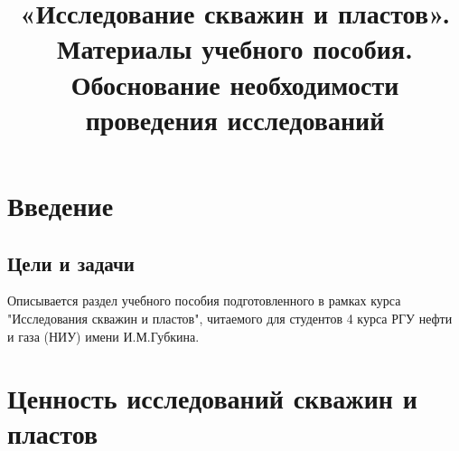 \documentclass[oneside, openany]{memoir}
\begin{document}
\title{«Исследование скважин и пластов». Материалы учебного пособия. Обоснование необходимости проведения исследований}

\maketitle

\chapter{Введение}
\section{Цели и задачи}
Описывается раздел учебного пособия подготовленного в рамках курса "Исследования скважин и пластов", читаемого для студентов 4 курса РГУ нефти и газа (НИУ) имени И.М.Губкина. %



\chapter{Ценность исследований скважин и пластов}




\printbibliography
\end{document}
